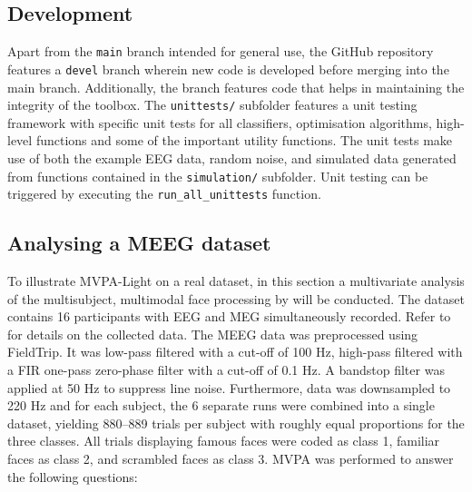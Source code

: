 \documentclass[utf8]{frontiersSCNS} %
\newcommand{\ttt}[1]{\texttt{#1}}
\begin{document}
\subsection{Development}\label{sec:development}

Apart from the \ttt{main} branch intended for general use, the GitHub repository features a \ttt{devel} branch wherein new code is developed before merging into the main branch. Additionally, the branch features code that helps in maintaining the integrity of the toolbox. The \ttt{unittests/} subfolder features a unit testing framework with specific unit tests for all classifiers, optimisation algorithms, high-level functions and some of the important utility functions. The unit tests make use of both the example EEG data, random noise, and simulated data generated from functions contained in the \ttt{simulation/} subfolder. Unit testing can be triggered by executing the \ttt{run\_all\_unittests} function.

\subsection{Analysing a MEEG dataset}

To illustrate MVPA-Light on a real dataset, in this section a multivariate analysis of the multisubject, multimodal face processing by \citep{Wakeman2015ADataset,Wakeman2014OpenfMRI} will be conducted. The dataset contains 16 participants with EEG and MEG simultaneously recorded. Refer to  \cite{Wakeman2015ADataset} for details on the collected data. The MEEG data was preprocessed using FieldTrip. It was low-pass filtered with a cut-off of 100 Hz, high-pass filtered with a FIR one-pass zero-phase filter with a cut-off of 0.1 Hz. A bandstop filter was applied at 50 Hz to suppress line noise. Furthermore, data was downsampled to 220 Hz and for each subject, the 6 separate runs were combined into a single dataset, yielding 880--889 trials per subject with roughly equal proportions for the three classes. All trials displaying famous faces were coded as class 1, familiar faces as class 2, and scrambled faces as class 3. MVPA was performed to answer the following questions:
\end{document}
